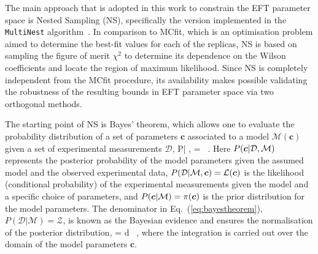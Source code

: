 The main approach that is adopted in this work to constrain the EFT parameter
space is Nested Sampling (NS), specifically
the version implemented in the {\tt MultiNest} algorithm~\cite{Feroz:2013hea}.
%
In comparison to MCfit, which is an optimisation problem aimed
to determine the best-fit values for each of the replicas, NS is based on 
sampling the figure of merit $\chi^2$  to determine its dependence
on the Wilson coefficients and locate the region of maximum likelihood.
%
Since NS is completely independent from the MCfit procedure,
its availability makes possible validating the robustness of the resulting bounds in EFT parameter
space via  two orthogonal methods. 

The starting point of NS is Bayes' theorem, which allows one to evaluate the
probability distribution of a set of parameters $\boldsymbol{c}$ 
associated to a model $\mathcal{M}(\boldsymbol{c})$
given a set of experimental measurements $\mathcal{D}$,
\be
\label{eq:bayestheorem}
P\lp{}| , \rp =  \, .
\ee
Here $P\lp\boldsymbol{c}| \mathcal{D},\mathcal{M} \rp $ represents the posterior
probability of the model parameters given the assumed model and the observed
experimental data,
$P\lp\mathcal{D}|\mathcal{M},\boldsymbol{c}
\rp = \mathcal{L}\lp\boldsymbol{c} \rp$ is the likelihood (conditional
probability) of the experimental measurements
given the model and a specific choice of parameters,
and $P\lp \boldsymbol{c}|\mathcal{M}  \rp = \pi \lp  \boldsymbol{c} \rp $
is the prior distribution for the model parameters.
%
The denominator in Eq.~(\ref{eq:bayestheorem}), $P(\mathcal{D}|\mathcal{M}) = \mathcal{Z}$,
is known as the Bayesian evidence and ensures the normalisation of the posterior
distribution,
\be
{} = \int {}\lp  {} \rp
\pi \lp  {} \rp d  \, ,
\ee
where the integration is carried out over the domain of the model parameters $\boldsymbol{c}$.

